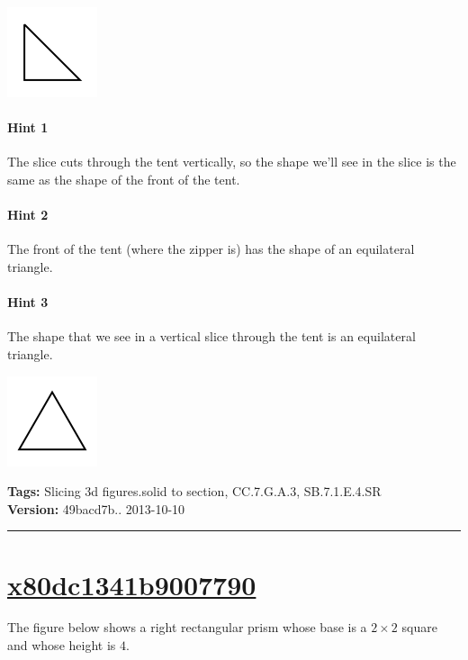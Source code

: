 \documentclass[twocolumn,10pt]{article}
\def\shrinkfactor{0.4}
\begin{document}
\includegraphics[scale=\shrinkfactor]{figures/02361468f7d85874956214c7a0a119b84a8c2651.png}



\paragraph{Hint 1}The slice cuts through the tent vertically, so the shape we'll see in the slice is the same as the shape of the  front of the tent.

\paragraph{Hint 2}The front of the tent (where the zipper is) has the shape of an equilateral triangle.

\paragraph{Hint 3}The shape that we see in a vertical slice through the tent is an equilateral triangle.   

\includegraphics[scale=\shrinkfactor]{figures/15c855a8a232e6c1873c5f46769050a9c13051b8.png}



\medskip
\noindent
\textbf{Tags:} {\footnotesize Slicing 3d figures.solid to section, CC.7.G.A.3, SB.7.1.E.4.SR}\\
\textbf{Version:} 49bacd7b.. 2013-10-10
\smallskip\hrule





\section{\href{https://www.khanacademy.org/devadmin/content/items/x80dc1341b9007790}{x80dc1341b9007790}}

\noindent
The figure below shows a right rectangular prism whose base is a $2 \times 2$ square and whose height is $4$. 
\end{document}
